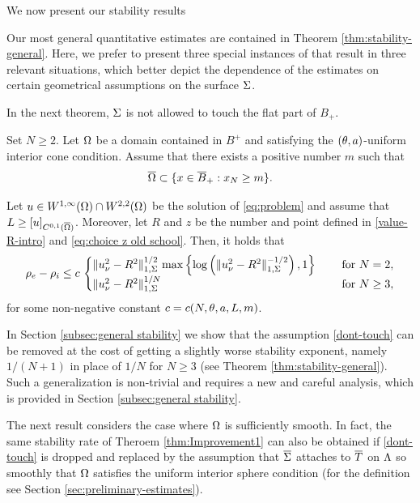 \documentclass[a4paper,10pt]{amsart}
\numberwithin{equation}{section}
\begin{document}
We now present our stability results


Our most general quantitative estimates are contained in Theorem \ref{thm:stability-general}.
Here, we prefer to present three special instances of that result in three relevant situations, which better depict the dependence of the estimates on certain geometrical assumptions on the surface $\Sigma$. 
\par
In the next theorem, $\Sigma$ is not allowed to touch the flat part of $B_+$.

\begin{thm}
\label{thm:Improvement1}
Set $N\ge 2$. Let $\Omega$ be a domain contained in $B^+$ and satisfying
the $(\theta,a)$-uniform interior cone condition. Assume that there exists a positive number $m$ such that 
\begin{equation}
\label{dont-touch}
\overline{\Omega}\subset\{ x\in \overline{B}_+: x_N\ge m\}.
\end{equation}
\par
Let $u \in W^{1,\infty}(\Omega)\cap W^{2,2} (\Omega)$ be the solution of \eqref{eq:problem} and assume that $L\ge [u]_{C^{0,1}(\overline{\Omega})}$.
Moreover, let $R$ and $z$ be the number and point defined in \eqref{value-R-intro} and \eqref{eq:choice z old school}.
Then, it holds that
	\begin{equation*}
		\rho_e-\rho_i\le c \,
		\begin{cases}
			\Vert u_\nu^2 - R^2 \Vert_{1,\Sigma}^{1/2} \, \max \left\{ \log \left(\Vert u_\nu^2 - R^2 \Vert_{1,\Sigma}^{- 1/2 }  \right) , 1 \right\} \quad & \text{ for } N =2 ,
			\\
			\Vert u_\nu^2 - R^2 \Vert_{1,\Sigma}^{1/N} \quad & \text{ for } N \ge 3 ,
		\end{cases}
	\end{equation*}
for some non-negative constant $c=c(N, \theta, a ,  L , m )$.
\end{thm}

In Section \ref{subsec:general stability} we show that the assumption \ref{dont-touch} can be removed at the cost of getting a slightly worse stability exponent, namely $1/(N+1)$ in place of $1/N$ for $N \ge 3$ (see Theorem \ref{thm:stability-general}). Such a generalization is non-trivial and requires a new and careful analysis, which is provided in Section \ref{subsec:general stability}.


The next result considers the case where $\Omega$ is sufficiently smooth. In fact, the same stability rate of Theroem \ref{thm:Improvement1} can also be obtained if \eqref{dont-touch} is dropped and replaced by the assumption that $\overline{\Sigma}$ attaches to $\overline{T}$ on $\Lambda$ so smoothly that $\Omega$ satisfies the uniform interior sphere condition (for the definition see Section \ref{sec:preliminary-estimates}). 
\end{document}
